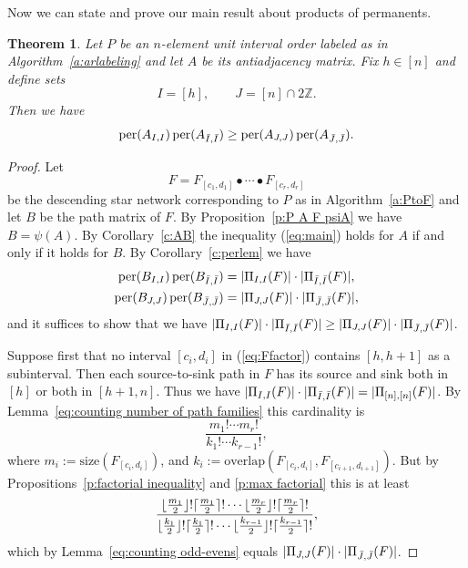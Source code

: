 \documentclass[12pt]{amsart}
\DeclarePairedDelimiter\ceil{\lceil}{\rceil}
\DeclarePairedDelimiter\floor{\lfloor}{\rfloor}
\newtheorem{thm}{Theorem}[section]
\theoremstyle{definition}
\numberwithin{equation}{section}
\newcommand{\defeq}{:=}
\DeclareMathOperator{\perm}{per}
\begin{document}
Now we can state and prove our main result about products of permanents.
\begin{thm}\label{t:main}
Let $P$ be an $n$-element unit interval order
labeled as in Algorithm~\ref{a:arlabeling}
and let $A$ be its antiadjacency matrix.
  Fix $h \in [n]$ and define sets
  \begin{equation*}
      I = [h] ,\qquad
      J = [n] \cap 2 \mathbb Z.
  \end{equation*}
  Then we have
  \begin{equation}\label{eq:main}
    \perm(A_{I,I})\perm(A_{\Bar I, \Bar I}) \geq \perm(A_{J,J})\perm(A_{\Bar J, \Bar J}).
  \end{equation}
  \end{thm}
\begin{proof}
Let
\begin{equation}\label{eq:Ffactor}
F = F_{[c_1,d_1]} \bullet \cdots \bullet F_{[c_r,d_r]}
\end{equation}
be the descending star network corresponding to $P$
as in Algorithm~\ref{a:PtoF}
and let $B$ be the path matrix of $F$.
By Proposition~\ref{p:P A F psiA}
we have $B = \psi(A)$.
By Corollary~\ref{c:AB}
the inequality (\ref{eq:main}) holds for $A$ if and only if
it holds for $B$.
By Corollary~\ref{c:perlem} we have
\begin{equation}
    \begin{gathered}
      \perm(B_{I,I}) \perm(B_{\Bar I,\Bar I}) =
      | \Pi_{I,I}(F)| \cdot |\Pi_{\Bar I,\Bar I}(F) |,\\
     \perm(B_{J,J}) \perm(B_{\Bar J,\Bar J}) =
     |\Pi_{J,J}(F) | \cdot | \Pi_{\Bar J,\Bar J}(F) |,
     \end{gathered}
     \end{equation}
and it suffices to show that we have
$|\Pi_{I,I}(F)|\cdot |\Pi_{\Bar I, \Bar I}(F)| \geq |\Pi_{J,J}(F)|\cdot |\Pi_{\Bar J, \Bar J}(F)|$.

Suppose first that no interval
$[c_i,d_i]$ in
(\ref{eq:Ffactor})
contains $[h,h+1]$ as a subinterval.
Then each source-to-sink path in $F$ has its
source and sink both in $[h]$ or both in $[h+1,n]$. Thus we have
$|\Pi_{I,I}(F)| \cdot |\Pi_{\Bar I, \Bar I}(F)| = |\Pi_{[n],[n]}(F)|$.
By Lemma~\ref{eq:counting number of path families}
this cardinality is
\begin{equation}\label{eq:mkratio}
 \frac{m_1! \cdots m_r!}{ k_1! \cdots k_{r-1}!},
\end{equation}
where
    $m_i \defeq \text{size}(F_{[c_i,d_i]})$,
and
$k_i \defeq \text{overlap}(F_{[c_i,d_i]},F_{[c_{i+1},d_{i+1}]})$.
But by Propositions~\ref{p:factorial inequality} and \ref{p:max factorial} this is at least
\begin{equation*}
    \frac{\floor{\tfrac{m_1}{2}}!\ceil{\tfrac{m_1}{2}}! \cdots  \floor{\tfrac{m_r}{2}}!\ceil{\tfrac{m_r}{2}}!}
     {\floor{\tfrac{k_1}{2}}!\ceil{\tfrac{k_1}{2}}! \cdots \floor{\tfrac{k_{r-1}}{2}}!\ceil{\tfrac{k_{r-1}}{2}}!},
     \end{equation*}
     which by Lemma~\ref{eq:counting odd-evens}
     equals
    $|\Pi_{J,J}(F) | \cdot |\Pi_{\Bar{J},\Bar{J}}(F)|$.


\end{proof}
\end{document}
